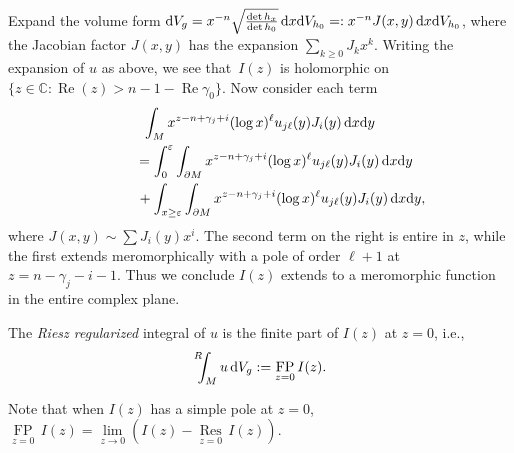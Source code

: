 \documentclass[pdftex]{sigma}
\numberwithin{equation}{section}
\renewcommand{\epsilon}{\varepsilon}
\newcommand{\del}{\partial}
\newcommand{\CC}{\mathbb C}
\newcommand{\FP}{\underset{z=0}{\operatorname{FP}}\,}
\newcommand{\Res}{\underset{z=0}{\operatorname{Res}}\,}
\newcommand{\Renint}{\mathop{\vphantom{T}}^R \! \! \! \int}
\DeclareMathOperator{\re}{Re}
\begin{document}
Expand the volume form ${\rm d}V_g = x^{-n} \sqrt{ \frac{\det h_x}{\det h_0} } \, {\rm d}x {\rm d}V_{h_0} =: x^{-n} J(x,y)\, {\rm d}x {\rm d}V_{h_0}$, where the Jacobian factor $J(x,y)$ has the expansion $\sum\limits_{k \geq 0} J_k x^k$. Writing the expansion of $u$ as above, we see that~$I(z)$ is holomorphic on $\{z \in \CC\colon \re(z)>n-1- \re \gamma_0\}$. Now consider each term
\begin{gather*}%
 \int_M x^{z-n+\gamma_j + i}(\log x)^\ell u_{j\ell}(y) J_i(y) \, {\rm d}x {\rm d}y \\
\qquad{} = \int_0^\epsilon \int_{\del M} x^{z-n+\gamma_j + i}(\log x)^\ell u_{j\ell}(y) J_i(y) \, {\rm d}x {\rm d}y \\
\qquad\quad{} + \int_{x \geq \epsilon} \int_{\del M} x^{z-n+\gamma_j + i}(\log x)^\ell u_{j\ell}(y) J_i(y) \, {\rm d}x {\rm d}y,
\end{gather*}
where $J(x,y) \sim \sum J_i(y) x^i$. The second term on the right is entire in $z$, while the first extends meromorphically with a pole of order $\ell+1$ at $z = n - \gamma_j - i - 1$. Thus we conclude $I(z)$ extends to a meromorphic function in the entire complex plane.

\begin{Definition}\label{definition4.1} The \emph{Riesz regularized} integral of $u$ is the finite part of $I(z)$ at $z=0$, i.e.,
\begin{gather*}%
\Renint_M u \, {\rm d}V_g:=\FP I(z).
\end{gather*}
\end{Definition}

Note that when $I(z)$ has a simple pole at $z=0$, $\FP I(z) = \lim\limits_{z\to 0} ( I(z)-\Res I(z) )$.
\end{document}
